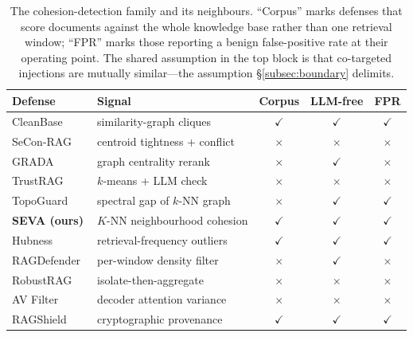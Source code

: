 \documentclass[10pt,journal,compsoc]{IEEEtran}
\begin{document}
\begin{table}[t]
\centering
\caption{The cohesion-detection family and its neighbours. ``Corpus'' marks defenses that score
documents against the whole knowledge base rather than one retrieval window; ``FPR'' marks those
reporting a benign false-positive rate at their operating point. The shared assumption in the
top block is that co-targeted injections are mutually similar---the assumption
\S\ref{subsec:boundary} delimits.}
\label{tab:family}
\begin{tabular}{llccc}
\toprule
Defense & Signal & Corpus & LLM-free & FPR \\
\midrule
CleanBase~\cite{cleanbase}   & similarity-graph cliques & $\checkmark$ & $\checkmark$ & $\checkmark$ \\
SeCon-RAG~\cite{secon}       & centroid tightness + conflict & $\times$ & $\times$ & $\times$ \\
GRADA~\cite{grada}           & graph centrality rerank & $\times$ & $\checkmark$ & $\times$ \\
TrustRAG~\cite{trustrag}     & $k$-means + LLM check & $\times$ & $\times$ & $\times$ \\
TopoGuard~\cite{topoguard}   & spectral gap of $k$-NN graph & $\times$ & $\checkmark$ & $\checkmark$ \\
\textbf{SEVA (ours)}         & $K$-NN neighbourhood cohesion & $\checkmark$ & $\checkmark$ & $\checkmark$ \\
\midrule
Hubness~\cite{hubness}       & retrieval-frequency outliers & $\checkmark$ & $\checkmark$ & $\checkmark$ \\
RAGDefender~\cite{ragdefender}& per-window density filter & $\times$ & $\checkmark$ & $\times$ \\
RobustRAG~\cite{robustrag}   & isolate-then-aggregate & $\times$ & $\times$ & $\times$ \\
AV Filter~\cite{avfilter}    & decoder attention variance & $\times$ & $\times$ & $\times$ \\
RAGShield~\cite{ragshield}   & cryptographic provenance & $\checkmark$ & $\checkmark$ & $\checkmark$ \\
\bottomrule
\end{tabular}
\end{table}
\end{document}
